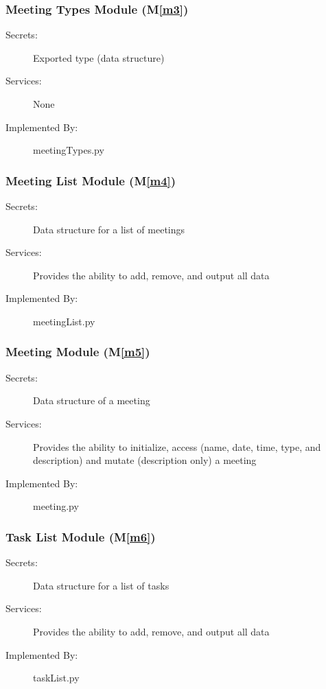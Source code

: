 \documentclass[12pt, titlepage]{article}
\newcommand{\mref}[1]{M\ref{#1}}
\begin{document}
\subsubsection{Meeting Types Module (\mref{m3})}
\begin{description}
    \item[Secrets:] Exported type (data structure)
    \item[Services:] None
    \item[Implemented By:] meetingTypes.py
\end{description}

\subsubsection{Meeting List Module (\mref{m4})}
\begin{description}
    \item[Secrets:] Data structure for a list of meetings
    \item[Services:] Provides the ability to add, remove, and output all data
    \item[Implemented By:] meetingList.py
\end{description}

\subsubsection{Meeting Module (\mref{m5})}
\begin{description}
    \item[Secrets:] Data structure of a meeting
    \item[Services:] Provides the ability to initialize, access (name, date, time, type, and description) and mutate (description only) a meeting
    \item[Implemented By:] meeting.py
\end{description}

\subsubsection{Task List Module (\mref{m6})}
\begin{description}
    \item[Secrets:] Data structure for a list of tasks
    \item[Services:] Provides the ability to add, remove, and output all data
    \item[Implemented By:] taskList.py
\end{description}
\end{document}
